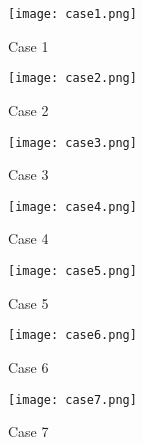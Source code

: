 \documentclass[conference,onecolumn,12pt]{IEEEtran}
\begin{document}
\newpage
\begin{figure}
    \centering
    \texttt{[image: case1.png]}
    \caption{Case 1}
    \label{fig:1}
\end{figure}

\begin{figure}
    \centering
    \texttt{[image: case2.png]}
    \caption{Case 2}
    \label{fig:2}
\end{figure}

\begin{figure}
    \centering
    \texttt{[image: case3.png]}
    \caption{Case 3}
    \label{3}
\end{figure}

\begin{figure}
    \centering
    \texttt{[image: case4.png]}
    \caption{Case 4}
    \label{4}
\end{figure}

\begin{figure}
    \centering
    \texttt{[image: case5.png]}
    \caption{Case 5}
    \label{5}
\end{figure}

\begin{figure}
    \centering
    \texttt{[image: case6.png]}
    \caption{Case 6}
    \label{6}
\end{figure}

\begin{figure}
    \centering
    \texttt{[image: case7.png]}
    \caption{Case 7}
    \label{7}
\end{figure}






\end{document}
